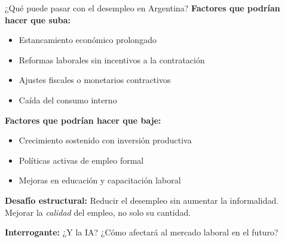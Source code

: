 \documentclass{beamer}
\begin{document}
\begin{frame}{¿Qué puede pasar con el desempleo en Argentina?}
    \small
    \textbf{Factores que podrían hacer que suba:}
    \begin{itemize}
        \item Estancamiento económico prolongado
        \item Reformas laborales sin incentivos a la contratación
        \item Ajustes fiscales o monetarios contractivos
        \item Caída del consumo interno
    \end{itemize}
    \vspace{0.15cm}
    \textbf{Factores que podrían hacer que baje:}
    \begin{itemize}
        \item Crecimiento sostenido con inversión productiva
        \item Políticas activas de empleo formal
        \item Mejoras en educación y capacitación laboral
    \end{itemize}
    \vspace{0.15cm}
    \textbf{Desafío estructural:}  
    Reducir el desempleo sin aumentar la informalidad. Mejorar la \textit{calidad} del empleo, no solo su cantidad.

    \vspace{0.15cm}
    \textbf{Interrogante:} ¿Y la IA? ¿Cómo afectará al mercado laboral en el futuro?
\end{frame}
\end{document}
